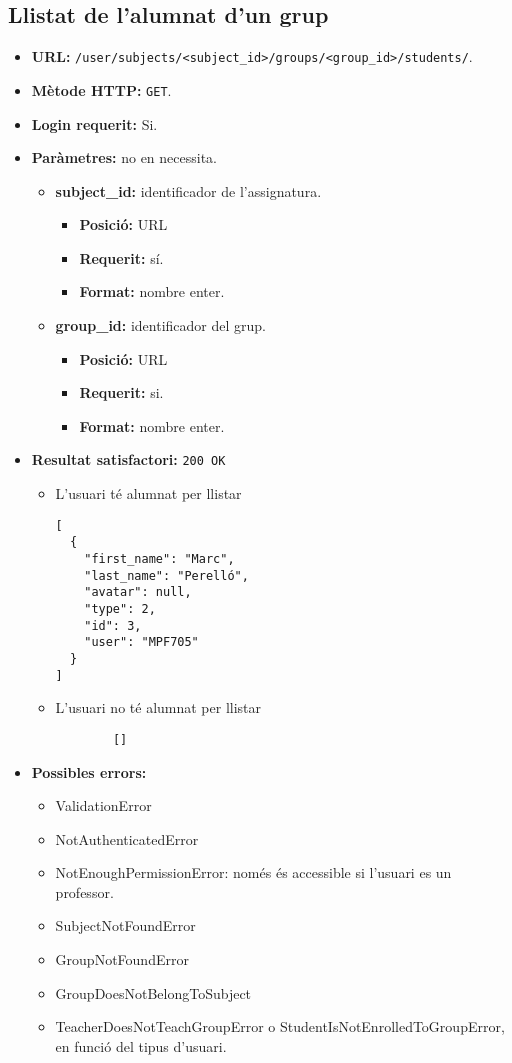 \subsection{Llistat de l'alumnat d'un grup}
\begin{itemize}
\item \textbf{\ac{URL}: } \texttt{/user/subjects/<subject\_id>/groups/<group\_id>/students/}.
\item \textbf{Mètode \ac{HTTP}: } \texttt{GET}.
\item \textbf{Login requerit:} Si.
\item \textbf{Paràmetres:} no en necessita.
		\begin{itemize}
		\item \textbf{subject\_id:} identificador de l'assignatura.
		\begin{itemize}
			\item \textbf{Posició:} \ac{URL}
			\item \textbf{Requerit:} sí.
			\item \textbf{Format:} nombre enter.
		\end{itemize}
		\item \textbf{group\_id:} identificador del grup.
		\begin{itemize}
			\item \textbf{Posició:} \ac{URL}
			\item \textbf{Requerit:} si.
			\item \textbf{Format:} nombre enter.
		\end{itemize}
	\end{itemize}
	
\item \textbf{Resultat satisfactori:} \texttt{200 OK}
	\begin{itemize}
		\item L'usuari té alumnat per llistar
		\begin{verbatim}
[
  {
    "first_name": "Marc",
    "last_name": "Perelló",
    "avatar": null,
    "type": 2,
    "id": 3,
    "user": "MPF705"
  }
]
		\end{verbatim}
		\item L'usuari no té alumnat per llistar
		\begin{verbatim}
		[]
		\end{verbatim}
	\end{itemize}
\item \textbf{Possibles errors:}
	\begin{itemize}
		\item ValidationError
		\item NotAuthenticatedError
		\item NotEnoughPermissionError: només és accessible si l'usuari es un professor.
		\item SubjectNotFoundError
		\item GroupNotFoundError
		\item GroupDoesNotBelongToSubject
		\item TeacherDoesNotTeachGroupError o StudentIsNotEnrolledToGroupError, en funció del tipus d'usuari.
	\end{itemize}
\end{itemize}

